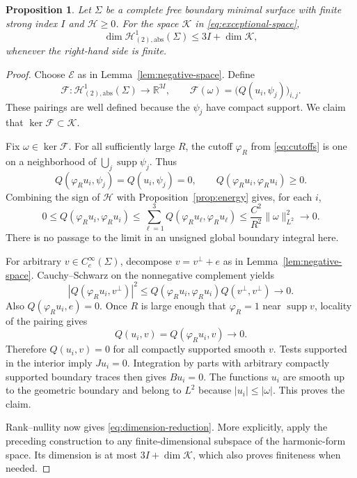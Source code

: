 \documentclass[11pt]{amsart}
\numberwithin{equation}{section}
\newtheorem{proposition}[theorem]{Proposition}
\theoremstyle{definition}
\theoremstyle{remark}
\newcommand{\R}{\mathbb R}
\newcommand{\HH}{\mathcal H}
\newcommand{\EE}{\mathcal E}
\newcommand{\KK}{\mathcal K}
\DeclareMathOperator{\supp}{supp}
\begin{document}
\begin{proposition}\label{prop:index-reduction}
Let $\Sigma$ be a complete free boundary minimal surface with finite strong index $I$ and $\mathscr H\ge0$. For the space $\KK$ in \eqref{eq:exceptional-space},
\begin{equation}\label{eq:dimension-reduction}
\dim\HH^1_{(2),\mathrm{abs}}(\Sigma)\le3I+\dim\KK,
\end{equation}
whenever the right-hand side is finite.
\end{proposition}
\begin{proof}
Choose $\EE$ as in Lemma~\ref{lem:negative-space}. Define
\[
\mathcal F:\HH^1_{(2),\mathrm{abs}}(\Sigma)\longrightarrow\R^{3I},
\qquad
\mathcal F(\omega)=\bigl(Q(u_i,\psi_j)\bigr)_{i,j}.
\]
These pairings are well defined because the $\psi_j$ have compact support. We claim that $\ker\mathcal F\subset\KK$.

Fix $\omega\in\ker\mathcal F$. For all sufficiently large $R$, the cutoff $\varphi_R$ from \eqref{eq:cutoffs} is one on a neighborhood of $\bigcup_j\supp\psi_j$. Thus
\[
Q(\varphi_Ru_i,\psi_j)=Q(u_i,\psi_j)=0,
\qquad Q(\varphi_Ru_i,\varphi_Ru_i)\ge0.
\]
Combining the sign of $\mathscr H$ with Proposition~\ref{prop:energy} gives, for each $i$,
\begin{equation}\label{eq:vanishing-energy}
0\le Q(\varphi_Ru_i,\varphi_Ru_i)
\le\sum_{\ell=1}^3Q(\varphi_Ru_\ell,\varphi_Ru_\ell)
\le\frac{C^2}{R^2}\|\omega\|_{L^2}^2\longrightarrow0.
\end{equation}
There is no passage to the limit in an unsigned global boundary integral here.

For arbitrary $v\in C_c^\infty(\Sigma)$, decompose $v=v^\perp+e$ as in Lemma~\ref{lem:negative-space}. Cauchy--Schwarz on the nonnegative complement yields
\[
|Q(\varphi_Ru_i,v^\perp)|^2
\le Q(\varphi_Ru_i,\varphi_Ru_i)Q(v^\perp,v^\perp)
\longrightarrow0.
\]
Also $Q(\varphi_Ru_i,e)=0$. Once $R$ is large enough that $\varphi_R=1$ near $\supp v$, locality of the pairing gives
\[
Q(u_i,v)=Q(\varphi_Ru_i,v)\longrightarrow0.
\]
Therefore $Q(u_i,v)=0$ for all compactly supported smooth $v$. Tests supported in the interior imply $Ju_i=0$. Integration by parts with arbitrary compactly supported boundary traces then gives $Bu_i=0$. The functions $u_i$ are smooth up to the geometric boundary and belong to $L^2$ because $|u_i|\le|\omega|$. This proves the claim.

Rank--nullity now gives \eqref{eq:dimension-reduction}. More explicitly, apply the preceding construction to any finite-dimensional subspace of the harmonic-form space. Its dimension is at most $3I+\dim\KK$, which also proves finiteness when needed.
\end{proof}
\end{document}
